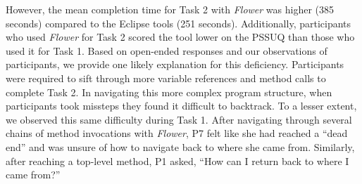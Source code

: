 \documentclass[conference]{IEEEtran}
\begin{document}
However, the mean completion time for Task 2 with \textit{Flower} was higher (385 seconds) compared to the Eclipse tools (251 seconds).
Additionally, participants who used \textit{Flower} for Task 2 scored the tool lower on the PSSUQ than those who used it for Task 1.
Based on open-ended responses and our observations of participants, we provide one likely explanation for this deficiency.
Participants were required to sift through more variable references and method calls to complete Task 2.
In navigating this more complex program structure, when participants took missteps they found it difficult to backtrack.
To a lesser extent, we observed this same difficulty during Task 1.
After navigating through several chains of method invocations with \textit{Flower}, P7 felt like she had reached a ``dead end'' and was unsure of how to navigate back to where she came from.
Similarly, after reaching a top-level method, P1 asked, ``How can I return back to where I came from?''





\end{document}
